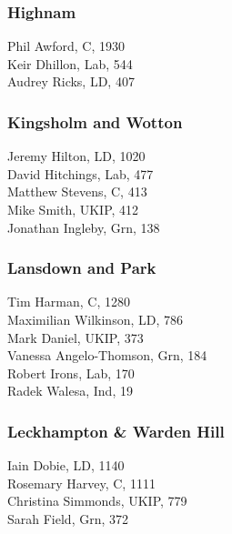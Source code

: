 \documentclass[a4paper,openany,10pt]{book}
\begin{document}
\subsubsection*{Highnam}



Phil Awford, C, 1930\\
Keir Dhillon, Lab, 544\\
Audrey Ricks, LD, 407\\


\subsubsection*{Kingsholm and Wotton}



Jeremy Hilton, LD, 1020\\
David Hitchings, Lab, 477\\
Matthew Stevens, C, 413\\
Mike Smith, UKIP, 412\\
Jonathan Ingleby, Grn, 138\\


\subsubsection*{Lansdown and Park}



Tim Harman, C, 1280\\
Maximilian Wilkinson, LD, 786\\
Mark Daniel, UKIP, 373\\
{Vanessa Angelo-Thomson}, Grn, 184\\
Robert Irons, Lab, 170\\
Radek Walesa, Ind, 19\\


\subsubsection*{Leckhampton \& Warden Hill}



Iain Dobie, LD, 1140\\
Rosemary Harvey, C, 1111\\
Christina Simmonds, UKIP, 779\\
Sarah Field, Grn, 372\\
\end{document}
